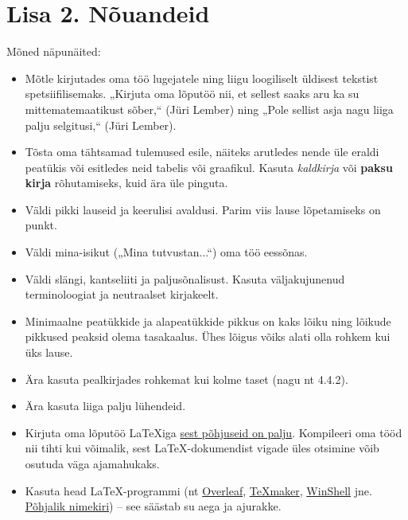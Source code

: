 \section*{Lisa 2. Nõuandeid} \label{appendix2}

Mõned näpunäited:
\begin{itemize}
\item Mõtle kirjutades oma töö lugejatele ning liigu loogiliselt üldisest tekstist spetsiifilisemaks. „Kirjuta oma lõputöö nii, et sellest saaks aru ka su mittematemaatikust sõber,“ (Jüri Lember) ning „Pole sellist asja nagu liiga palju selgitusi,“ (Jüri Lember).

\item Tõsta oma tähtsamad tulemused esile, näiteks arutledes nende üle eraldi peatükis või esitledes neid tabelis või graafikul. Kasuta \textit{kaldkirja} või \textbf{paksu kirja} rõhutamiseks, kuid ära üle pinguta.
  
\item Väldi pikki lauseid ja keerulisi avaldusi. Parim viis lause lõpetamiseks on punkt.

\item Väldi mina-isikut („Mina tutvustan...“) oma töö eessõnas.

\item Väldi slängi, kantseliiti ja paljusõnalisust. Kasuta väljakujunenud terminoloogiat ja neutraalset kirjakeelt.

\item Minimaalne peatükkide ja alapeatükkide pikkus on kaks lõiku ning lõikude pikkused peaksid olema tasakaalus. Ühes lõigus võiks alati olla rohkem kui üks lause.

\item Ära kasuta pealkirjades rohkemat kui kolme taset (nagu nt 4.4.2).

\item Ära kasuta liiga palju lühendeid.

\item Kirjuta oma lõputöö \LaTeX iga \href{https://amrys.wordpress.com/2013/01/16/why-your-should-latex-your-dissertation-or-why-you-dont-have-to-write-your-dissertation-in-word/}{sest põhjuseid on palju}. Kompileeri oma tööd nii tihti kui võimalik, sest \LaTeX-dokumendist vigade üles otsimine võib osutuda väga ajamahukaks.

\item Kasuta head \LaTeX-programmi (nt \href{https://www.overleaf.com/}{Overleaf}, \href{https://www.xm1math.net/texmaker/}{TeXmaker}, \href{https://www.winshell.org/}{WinShell} jne. \href{https://tex.stackexchange.com/questions/339/latex-editors-ides}{Põhjalik nimekiri}) -- see säästab su aega ja ajurakke.


\end{itemize}
